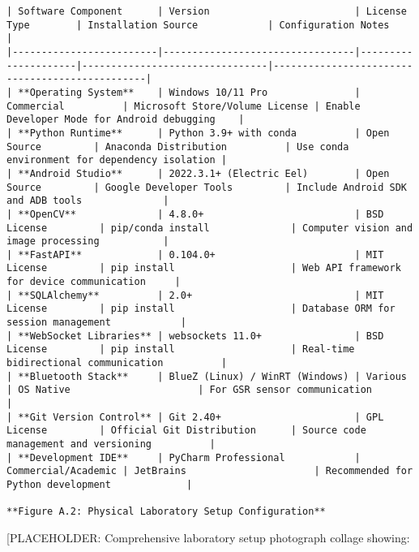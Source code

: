 \documentclass[11pt,a4paper]{report}
\begin{document}
\begin{verbatim}
| Software Component      | Version                         | License Type        | Installation Source            | Configuration Notes                            |
|-------------------------|---------------------------------|---------------------|--------------------------------|------------------------------------------------|
| **Operating System**    | Windows 10/11 Pro               | Commercial          | Microsoft Store/Volume License | Enable Developer Mode for Android debugging    |
| **Python Runtime**      | Python 3.9+ with conda          | Open Source         | Anaconda Distribution          | Use conda environment for dependency isolation |
| **Android Studio**      | 2022.3.1+ (Electric Eel)        | Open Source         | Google Developer Tools         | Include Android SDK and ADB tools              |
| **OpenCV**              | 4.8.0+                          | BSD License         | pip/conda install              | Computer vision and image processing           |
| **FastAPI**             | 0.104.0+                        | MIT License         | pip install                    | Web API framework for device communication     |
| **SQLAlchemy**          | 2.0+                            | MIT License         | pip install                    | Database ORM for session management            |
| **WebSocket Libraries** | websockets 11.0+                | BSD License         | pip install                    | Real-time bidirectional communication          |
| **Bluetooth Stack**     | BlueZ (Linux) / WinRT (Windows) | Various             | OS Native                      | For GSR sensor communication                   |
| **Git Version Control** | Git 2.40+                       | GPL License         | Official Git Distribution      | Source code management and versioning          |
| **Development IDE**     | PyCharm Professional            | Commercial/Academic | JetBrains                      | Recommended for Python development             |

**Figure A.2: Physical Laboratory Setup Configuration**

\end{verbatim}
[PLACEHOLDER: Comprehensive laboratory setup photograph collage showing:
\end{document}
